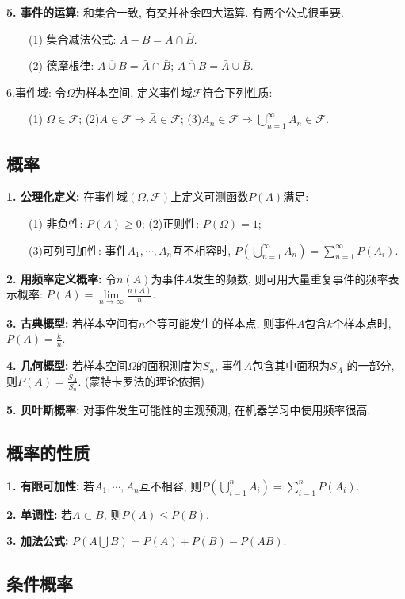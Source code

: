 \textbf{5. 事件的运算: }和集合一致, 有交并补余四大运算. 有两个公式很重要.

~~~~(1) 集合减法公式: $A-B=A \cap \bar{B}$.

~~~~(2) 德摩根律: $\overline{A \cup B}=\bar{A} \cap \bar{B}$; $\overline{A \cap B}=\bar{A} \cup \bar{B}$.

6.事件域: 令$\Omega$为样本空间, 定义事件域$\mathscr{F}$符合下列性质:

~~~~(1) $\Omega \in \mathscr{F}$; (2)$A \in \mathscr{F} \Rightarrow \bar{A} \in \mathscr{F}$; (3)$A_n \in \mathscr{F} \Rightarrow \bigcup\limits_{n=1}^\infty A_n \in \mathscr{F}$.

\subsection{概率}

\textbf{1. 公理化定义: }在事件域$(\Omega,\mathscr{F})$上定义可测函数$P(A)$满足:

~~~~(1) 非负性: $P(A) \geq 0$; (2)正则性: $P(\Omega)=1$;

~~~~(3)可列可加性: 事件$A_1,\cdots,A_n$互不相容时, $P(\bigcup\limits_{n=1}^\infty A_n)=\sum\limits_{n=1}^\infty P(A_i)$.

\textbf{2. 用频率定义概率: }令$n(A)$为事件$A$发生的频数, 则可用大量重复事件的频率表示概率: $P(A)=\lim\limits_{n \rightarrow \infty} \frac{n(A)}{n}$.

\textbf{3. 古典概型: }若样本空间有$n$个等可能发生的样本点, 则事件$A$包含$k$个样本点时, $P(A)=\frac{k}{n}$.

\textbf{4. 几何概型: }若样本空间$\Omega$的面积测度为$S_n$, 事件$A$包含其中面积为$S_A$ 的一部分, 则$P(A)=\frac{S_A}{S_n}$. (蒙特卡罗法的理论依据)

\textbf{5. 贝叶斯概率: }对事件发生可能性的主观预测, 在机器学习中使用频率很高.

\subsection{概率的性质}

\textbf{1. 有限可加性: }若$A_1,\cdots,A_n$互不相容, 则$P(\bigcup\limits_{i=1}^n A_i)=\sum\limits_{i=1}^n P(A_i)$.

\textbf{2. 单调性: }若$A \subset B$, 则$P(A)\leq P(B)$.

\textbf{3. 加法公式: }$P(A \bigcup B)=P(A)+P(B)-P(AB)$.

\subsection{条件概率}

